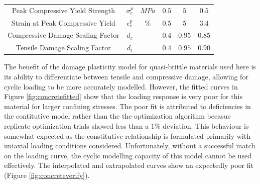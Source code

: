 \begin{table}[!htb]
\begin{tabulary}{\textwidth}{@{}cCcCCC@{}}
Peak Compressive Yield Strength    & $\sigma_c^{p}$                   & $MPa$          & $0.5$                                                           & $5$                                                             & $0.5$                                                             \\
Strain at Peak Compressive Yield   & $\epsilon_c^{p}$                 & $\%$           & $0.5$                                                           & $5$                                                             & $3.4$                                                             \\
Compressive Damage Scaling Factor   & $d_c$ &            & $0.4$                                                          & $0.95$                                                           & $0.85$                                                          \\
Tensile Damage Scaling Factor   & $d_t$ &            & $0.4$                                                           & $0.95$                                                            & $0.90$                                                            \\ \bottomrule
\end{tabulary}
\end{table}

The benefit of the damage plasticity model for quasi-brittle materials used here is its ability to differentiate between tensile and compressive damage, allowing for cyclic loading to be more accurately modelled. However, the fitted curves in Figure \ref{fig:concretefitted} show that the loading response is very poor for this material for larger confining stresses. The poor fit is attributed to deficiencies in the contitutive model rather than the the optimization algorithm becasue replicate optimization trials showed less than a $1\%$ deviation. This behaviour is somewhat expected as the constitutive relationship is formulated primarily with uniaxial loading conditions considered. Unfortunately, without a successful match on the loading curve, the cyclic modelling capacity of this model cannot be used effectively. The interpolated and extrapolated curves show an expectedly poor fit (Figure \ref{fig:concreteverify}).

